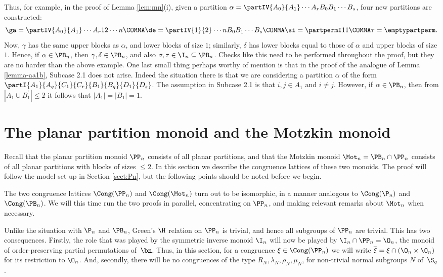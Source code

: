 Thus, for example, in the proof of Lemma \ref{lem:mn}(i), given a partition
$\alpha=\partIV{A_0}{A_1}\cdots{A_r}{B_0}{B_1}\cdots{B_s}$,
four new partitions are constructed:
\[
\ga=\partIV{A_0}{A_1}\cdots{A_r}{1}{2}\cdots{n}\COMMA
\de=\partIV{1}{2}\cdots{n}{B_0}{B_1}\cdots{B_s}\COMMA
\si=\partpermI11\COMMA
\tau=\emptypartperm .
\]
Now, $\gamma$ has the same upper blocks as $\alpha$, and lower blocks of size $1$;
similarly, $\delta$ has lower blocks equal to those of $\alpha$ and upper blocks of size $1$. Hence, if $\alpha\in\PB_n$, then $\gamma,\delta\in\PB_n$, and also
$\sigma,\tau\in\I_n\subseteq \PB_n$.
Checks like this need to be performed throughout the proof, but they are no harder than the above example.
%
One last small thing perhaps worthy of mention is that in the proof of the analogue of Lemma
\ref{lemma-aa1b}, Subcase 2.1 does not arise.
Indeed the situation there is that we are considering a partition $\alpha$ of the form
$\partI{A_1}{A_q}{C_1}{C_r}{B_1}{B_q}{D_1}{D_s}$.
The assumption in Subcase 2.1 is that $i,j\in A_1$ and $i\neq j$. However,
if $\alpha\in\PB_n$, then from $|A_1\cup B_1^\prime|\leq 2$ it follows that
$|A_1|=|B_1|=1$.








\section{The planar partition monoid  and the Motzkin monoid }
\label{sec:PPnMn}

Recall that the planar partition monoid $\PP_n$ consists of all planar partitions,
and that the Motzkin monoid $\Mot_n=\PB_n\cap \PP_n$ consists of all planar partitions with blocks of sizes $\leq 2$.
In this section we describe the congruence lattices of these two monoids. The proof will follow
the model set up in Section \ref{sect:Pn}, but the following points should be noted before we begin.

The two congruence lattices $\Cong(\PP_n)$ and $\Cong(\Mot_n)$ turn out to be isomorphic, in a manner analogous to $\Cong(\P_n)$ and $\Cong(\PB_n)$. We will this time run the two proofs in parallel, concentrating on $\PP_n$, and making relevant remarks about $\Mot_n$ when necessary.

Unlike the situation with $\P_n$ and $\PB_n$, Green's $\H$ relation on $\PP_n$ is trivial, and hence all subgroups of $\PP_n$ are trivial. This has two consequences. Firstly, the role that was played by the symmetric inverse monoid $\I_n$
will now be played by $\I_n\cap \PP_n=\O_n$, the monoid of order-preserving partial permutations of~$\bn$. 
Thus, in this section, for a congruence $\xi\in\Cong(\PP_n)$ we will write $\overline{\xi}=\xi\cap(\O_n\times\O_n)$ for its restriction to $\O_n$.
And, secondly, there will be no congruences of the type $R_N,\lambda_N,\rho_N,\mu_N$, for non-trivial normal subgroups $N$ of~$\S_q$.

